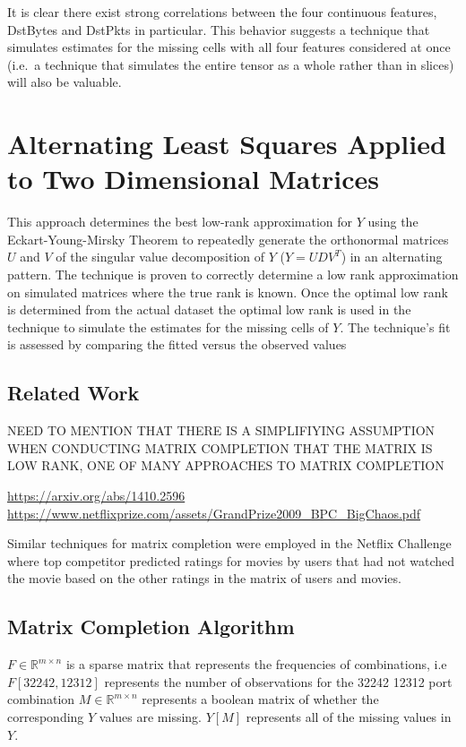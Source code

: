\documentclass[12pt,twoside]{dukestatscithesis}
\theoremstyle{definition}
\theoremstyle{definition}
\theoremstyle{definition}
\theoremstyle{remark}
\begin{document}
It is clear there exist strong correlations between the four continuous
features, DstBytes and DstPkts in particular. This behavior suggests a
technique that simulates estimates for the missing cells with all four
features considered at once (i.e.~a technique that simulates the entire
tensor as a whole rather than in slices) will also be valuable.

\chapter{Alternating Least Squares Applied to Two Dimensional
Matrices}\label{alternating-least-squares-applied-to-two-dimensional-matrices}

This approach determines the best low-rank approximation for \(Y\) using
the Eckart-Young-Mirsky Theorem to repeatedly generate the orthonormal
matrices \(U\) and \(V\) of the singular value decomposition of \(Y\)
(\(Y = UDV^T\)) in an alternating pattern. The technique is proven to
correctly determine a low rank approximation on simulated matrices where
the true rank is known. Once the optimal low rank is determined from the
actual dataset the optimal low rank is used in the technique to simulate
the estimates for the missing cells of \(Y\). The technique's fit is
assessed by comparing the fitted versus the observed values

\section{Related Work}\label{related-work}

NEED TO MENTION THAT THERE IS A SIMPLIFIYING ASSUMPTION WHEN CONDUCTING
MATRIX COMPLETION THAT THE MATRIX IS LOW RANK, ONE OF MANY APPROACHES TO
MATRIX COMPLETION

\url{https://arxiv.org/abs/1410.2596}
\url{https://www.netflixprize.com/assets/GrandPrize2009_BPC_BigChaos.pdf}

Similar techniques for matrix completion were employed in the Netflix
Challenge where top competitor predicted ratings for movies by users
that had not watched the movie based on the other ratings in the matrix
of users and movies.

\section{Matrix Completion Algorithm}\label{matrix-completion-algorithm}

\(F \in \mathbb{R}^{m \times n}\) is a sparse matrix that represents the
frequencies of combinations, i.e \(F[32242,12312]\) represents the
number of observations for the 32242 12312 port combination
\(M \in \mathbb{R}^{m \times n}\) represents a boolean matrix of whether
the corresponding \(Y\) values are missing. \(Y[M]\) represents all of
the missing values in \(Y\).
\end{document}

